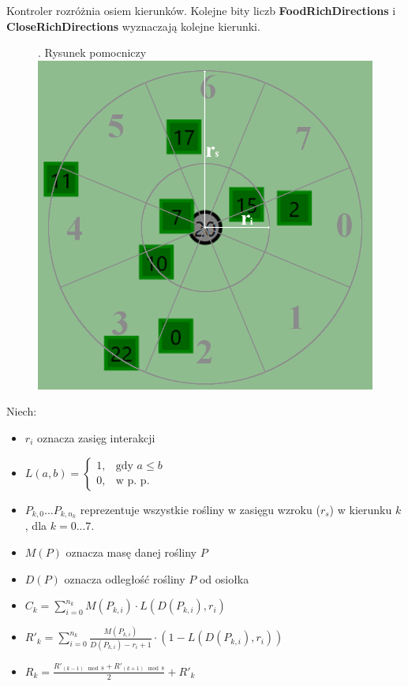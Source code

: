 Kontroler rozróżnia osiem kierunków. Kolejne bity liczb \textbf{FoodRichDirections} i \textbf{CloseRichDirections} wyznaczają kolejne kierunki.

\begin{figure}[H]
    . Rysunek pomocniczy\\
    \includegraphics[scale=0.4]{Chapters/vision}
\end{figure}

Niech:
\begin{itemize}
    \item $r_{i}$ oznacza zasięg interakcji
    \item
     $L(a,b)= 
    \begin{cases}
        1,& \text{gdy } a\leq b\\
        0,              & \text{w p. p.}
    \end{cases}
    $
    \item $P_{k,0}...P_{k,n_{k}}$ reprezentuje wszystkie rośliny w zasięgu wzroku ($r_{s}$) w kierunku $k$, dla $k=0...7$. 
    \item $M(P)$ oznacza masę danej rośliny $P$
    \item $D(P)$ oznacza odległość rośliny $P$ od osiołka
    \item $C_{k} = \sum_{i=0}^{n_{k}} M(P_{k,i}) \cdot L(D(P_{k,i}),r_{i})  $
    \item $R'_{k} = \sum_{i=0}^{n_{k}} \frac{M(P_{k,i})}{D(P_{k,i}) - r_{i} + 1} \cdot (1-L(D(P_{k,i}),r_{i})) $
    \item $R_{k} = \frac{R'_{(k-1) \mod 8} + R'_{(k+1) \mod 8}}{2} + R'_{k}$
\end{itemize}

